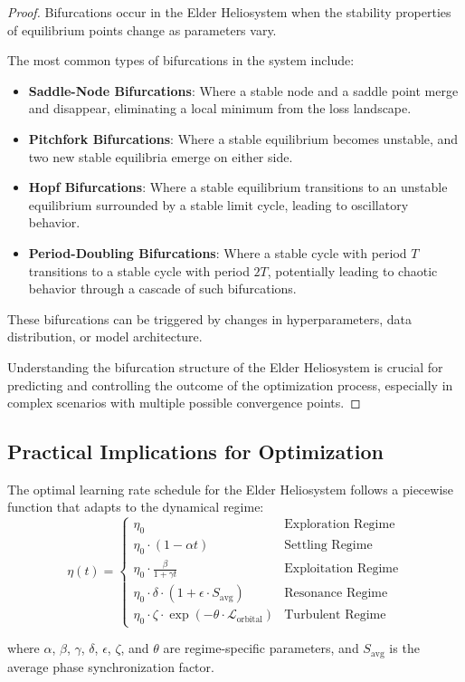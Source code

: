 \begin{proof}
Bifurcations occur in the Elder Heliosystem when the stability properties of equilibrium points change as parameters vary.

The most common types of bifurcations in the system include:
\begin{itemize}
    \item \textbf{Saddle-Node Bifurcations}: Where a stable node and a saddle point merge and disappear, eliminating a local minimum from the loss landscape.
    \item \textbf{Pitchfork Bifurcations}: Where a stable equilibrium becomes unstable, and two new stable equilibria emerge on either side.
    \item \textbf{Hopf Bifurcations}: Where a stable equilibrium transitions to an unstable equilibrium surrounded by a stable limit cycle, leading to oscillatory behavior.
    \item \textbf{Period-Doubling Bifurcations}: Where a stable cycle with period $T$ transitions to a stable cycle with period $2T$, potentially leading to chaotic behavior through a cascade of such bifurcations.
\end{itemize}

These bifurcations can be triggered by changes in hyperparameters, data distribution, or model architecture.

Understanding the bifurcation structure of the Elder Heliosystem is crucial for predicting and controlling the outcome of the optimization process, especially in complex scenarios with multiple possible convergence points.
\end{proof}

\subsection{Practical Implications for Optimization}

\begin{theorem}
The optimal learning rate schedule for the Elder Heliosystem follows a piecewise function that adapts to the dynamical regime:
\begin{equation}
\eta(t) = 
\begin{cases}
\eta_0 & \text{Exploration Regime} \\
\eta_0 \cdot (1 - \alpha t) & \text{Settling Regime} \\
\eta_0 \cdot \frac{\beta}{1 + \gamma t} & \text{Exploitation Regime} \\
\eta_0 \cdot \delta \cdot (1 + \epsilon \cdot S_{\text{avg}}) & \text{Resonance Regime} \\
\eta_0 \cdot \zeta \cdot \exp(-\theta \cdot \mathcal{L}_{\text{orbital}}) & \text{Turbulent Regime}
\end{cases}
\end{equation}

where $\alpha$, $\beta$, $\gamma$, $\delta$, $\epsilon$, $\zeta$, and $\theta$ are regime-specific parameters, and $S_{\text{avg}}$ is the average phase synchronization factor.
\end{theorem}

